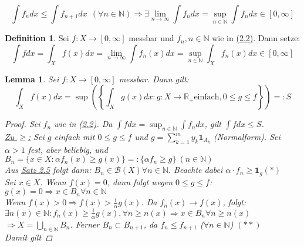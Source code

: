 \documentclass[a4paper]{scrreprt}
\newcommand{\doubleOne}{\textbf{1}}
\newcommand{\R}{\mathbb{R}}
\newcommand{\N}{\mathbb{N}}
\newcommand{\Borel}{\mathcal{B}}
\newcommand{\toInf}{\rightarrow \infty}
\newcommand{\limToInf}[1]{\lim_{#1 \toInf}}
\newcommand{\jlabel}[1]{\label{j_#1}}
\newcommand{\jhyperref}[2]{\hyperref[j_#1]{#2}}
\newcommand{\jlink}[1]{\jhyperref{#1}{#1}}
\theoremstyle{plain}
\newtheorem{lem}[thm]{Lemma}
\theoremstyle{definition}
\newtheorem{defn}[thm]{Definition}
\begin{document}
{{{\begin{displaymath}
    \int f_n dx \le \int f_{n+1} dx \ \ (\forall n \in \N)
    \Rightarrow \exists \limToInf{n} \int f_n dx = \sup_{n \in \N} \int f_n dx \in [0, \infty]
\end{displaymath}

\begin{defn}
\jlabel{Def 2.16}
    Sei $f: X \rightarrow [0,\infty]$ messbar und $f_n, n \in \N$ wie in \jlink{(2.2)}. Dann setze:
    \begin{displaymath}
        \int f dx = \int_X f(x) dx = \limToInf{n} \int f_n(x) dx = \sup_{n \in \N} \int_X f_n(x) dx \in [0,\infty]
    \end{displaymath}
\end{defn}

\begin{lem}
\jlabel{Lem 2.17}
    Sei $f: X \rightarrow [0, \infty]$ messbar. Dann gilt:
    \begin{displaymath}
        \int_X f(x) dx = \sup \left(\left\{\int_X g(x) dx : g: X \rightarrow \R_+ \text{einfach}, 0 \le g \le f\right\}\right) =: S
    \end{displaymath}
    \begin{proof}
        Sei $f_n$ wie in \jlink{(2.2)}. Da $\int f dx = \sup_{n \in \N} \int f_n dx$, gilt $\int f dx \le S$. \\
        \uline{Zu $\ge$:} Sei $g$ einfach mit $0 \le g \le f$ und $g = \sum_{k=1}^m y_k \doubleOne_{A_k}$ (Normalform). Sei $\alpha > 1$ fest, aber beliebig, und $B_n = \{x \in X : \alpha f_n(x) \ge g(x)\} =: \{\alpha f_n \ge g\} \ (n \in \N)$ \\
        Aus \jlink{Satz 2.5} folgt dann: $B_n \in \Borel(X) \forall n \in \N$. Beachte dabei $\alpha \cdot f_n \ge \doubleOne_g (*)$ \\
        Sei $x \in X$. Wenn $f(x) = 0$, dann folgt wegen $0 \le g \le f$: \\
        $g(x) = 0 \Rightarrow x \in B_n \forall n \in \N$ \\
        Wenn $f(x) > 0 \Rightarrow f(x) > \frac{1}{\alpha} g(x)$. Da $f_n(x) \rightarrow f(x)$, folgt: \\
        $\exists n(x) \in \N: f_n(x) \ge \frac{1}{\alpha} g(x), \forall n \ge n(x) \Rightarrow x \in B_n \forall n \ge n(x)$ \\
        $\Rightarrow X = \bigcup_{n \in \N} B_n$. Ferner $B_n \subset B_{n+1}$, da $f_n \le f_{n+1}$ ($\forall n \in \N$) $(**)$ \\
        Damit gilt

\end{proof}
\end{lem}}}}
\end{document}
